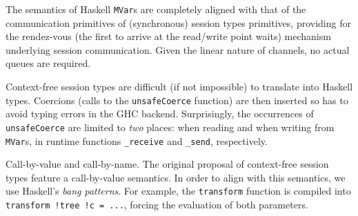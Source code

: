 The semantics of Haskell \lstinline|MVar|s are completely aligned with
that of the communication primitives of (synchronous) session types
primitives, providing for the rendez-vous (the first to arrive at the
read/write point waits) mechanism underlying session
communication. Given the linear nature of \freest{} channels, no
actual queues are required.

Context-free session types are difficult (if not impossible) to
translate into Haskell types. Coercions (calls to the
\lstinline|unsafeCoerce| function) are then inserted so has to avoid
typing errors in the GHC backend. Surprisingly, the occurrences of
\lstinline|unsafeCoerce| are limited to \emph{two} places: when reading
and when writing from \lstinline|MVar|s, in runtime functions
\lstinline|_receive| and \lstinline|_send|, respectively.

Call-by-value and call-by-name. The original proposal of context-free
session types feature a call-by-value semantics. In order to align
\freest{} with this semantics, we use Haskell's \emph{bang
  patterns}. For example, the \lstinline|transform| function is
compiled into \lstinline|transform !tree !c = ...|, forcing the
evaluation of both parameters.

